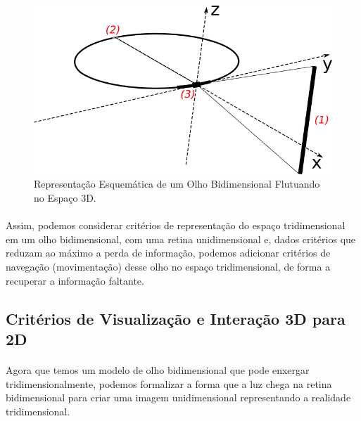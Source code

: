\documentclass{article}
\begin{document}
	\begin{figure}[h]
		\centering
		\includegraphics[scale=0.7]{Olho-Bidimensional}
		\caption{Representação Esquemática de um Olho Bidimensional Flutuando no Espaço 3D.}
		\label{fig:Olho2D}
	\end{figure}
	
	\paragraph{}
	Assim, podemos considerar critérios de representação do espaço tridimensional em um olho bidimensional, com uma retina unidimensional e, dados critérios que reduzam ao máximo a perda de informação, podemos adicionar critérios de navegação (movimentação) desse olho no espaço tridimensional, de forma a recuperar a informação faltante.
	
	\subsection{Critérios de Visualização e Interação 3D para 2D} \label{criterios}
	
	\paragraph{}
	Agora que temos um modelo de olho bidimensional que pode enxergar tridimensionalmente, podemos formalizar a forma que a luz chega na retina bidimensional para criar uma imagem unidimensional representando a realidade tridimensional.
	
\end{document}
